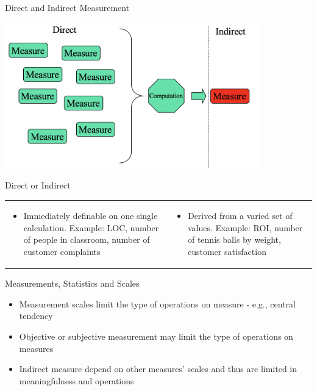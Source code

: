 \documentclass{beamer}
\begin{document}
\begin{frame}{\centerline{Direct and Indirect Measurement}}

\begin{center}
\includegraphics[width=110mm]{A2022.ScaleDeiDati/img-img17.png}
\end{center}

\end{frame}

\begin{frame}{\centerline{Direct or Indirect}}

\begin{table}[H]
\begin{tabulary}{\textwidth}{m{6cm} m{5cm}}
\begin{itemize}    
\item Immediately definable on one single calculation. Example: LOC, number of people in classroom, number of customer complaints
\end{itemize} &
\begin{itemize}    
\item Derived from a varied set of values. Example: ROI, number of tennis balls by weight, customer satisfaction
\end{itemize}
\end{tabulary}
\end{table}

\end{frame}

\begin{frame}{\centerline{Measurements, Statistics and Scales}}

\begin{itemize}    
\item Measurement scales limit the type of operations on measure - e.g., central tendency
\item Objective or subjective measurement may limit the type of operations on measures
\item Indirect measure depend on other measures’ scales and thus are limited in meaningfulness and operations
\end{itemize}

\end{frame}
\end{document}
